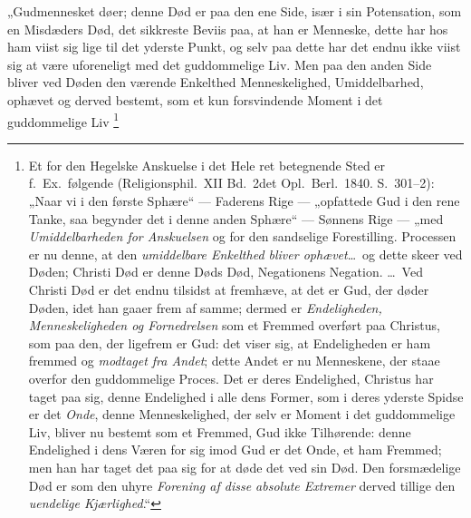 \documentclass[12pt]{book}
\begin{document}
„Gudmennesket døer; denne Død er paa den ene Side, især i sin
Potensation, som en Misdæders Død, det sikkreste Beviis paa, at han
er Menneske, dette har hos ham viist sig lige til det yderste Punkt,
og selv paa dette har det endnu ikke viist sig at være uforeneligt
med det guddommelige Liv. Men paa den anden Side bliver ved Døden
den værende Enkelthed Menneskelighed, Umiddelbarhed, ophævet og
derved bestemt, som et kun forsvindende Moment i det guddommelige
Liv%
\footnote{Et for den Hegelske Anskuelse i det Hele ret betegnende
Sted er f.\ Ex.\ følgende (Religionsphil.\ XII Bd.\ 2det Opl.\
Berl.\ 1840. S.\ 301--2): „Naar vi i den første Sphære“ --- Faderens
Rige --- „opfattede Gud i den rene Tanke, saa begynder det i denne
anden Sphære“ --- Sønnens Rige --- „med \emph{Umiddelbarheden for
Anskuelsen} og for den sandselige Forestilling. Processen er nu
denne, at den \emph{umiddelbare Enkelthed bliver ophævet}\dots\ og
dette skeer ved Døden; Christi Død er denne Døds Død, Negationens
Negation. \dots\ Ved Christi Død er det endnu tilsidst at fremhæve,
at det er Gud, der døder Døden, idet han gaaer frem af samme;
dermed er \emph{Endeligheden, Menneskeligheden og Fornedrelsen} som
et Fremmed overført paa Christus, som paa den, der ligefrem er Gud:
det viser sig, at Endeligheden er ham fremmed og \emph{modtaget fra
Andet}; dette Andet er nu Menneskene, der staae overfor den
guddommelige Proces. Det er deres Endelighed, Christus har taget paa
sig, denne Endelighed i alle dens Former, som i deres yderste Spidse
er det \emph{Onde}, denne Menneskelighed, der selv er Moment i det
guddommelige Liv, bliver nu bestemt som et Fremmed, Gud ikke
Tilhørende: denne Endelighed i dens Væren for sig imod Gud er det
Onde, et ham Fremmed; men han har taget det paa sig for at døde det
ved sin Død. Den forsmædelige Død er som den uhyre \emph{Forening af
disse absolute Extremer} derved tillige den \emph{uendelige
Kjærlighed}.“

}
\end{document}

